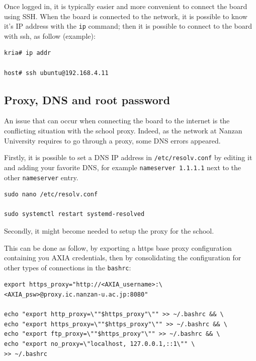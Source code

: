 \documentclass[10pt]{article}
\begin{document}
Once logged in, it is typically easier and more convenient to connect the board using SSH.
When the board is connected to the network, it is possible to know it's IP address with
the \verb|ip| command; then it is possible to connect to the board with ssh, as follow (example):
\begin{tcolorbox}
\begin{verbatim}
kria# ip addr

host# ssh ubuntu@192.168.4.11
\end{verbatim}
\end{tcolorbox}

\subsection{Proxy, DNS and root password}
\label{sec:proxy-dns}
An issue that can occur when connecting the board to the internet is the conflicting situation with
the school proxy.
Indeed, as the network at Nanzan University requires to go through a proxy, some DNS errors appeared.

Firstly, it is possible to set a DNS IP address in \verb|/etc/resolv.conf| by editing it and adding your favorite DNS, for example \verb|nameserver 1.1.1.1|
next to the other \verb|nameserver| entry.
\begin{tcolorbox}
\begin{verbatim}
sudo nano /etc/resolv.conf

sudo systemctl restart systemd-resolved
\end{verbatim}
\end{tcolorbox}

Secondly, it might become needed to setup the proxy for the school.

This can be done as follow, by exporting a https base proxy configuration containing you AXIA credentials, then
by consolidating the configuration for other types of connections in the \verb|bashrc|:
\begin{tcolorbox}
\begin{verbatim}
export https_proxy="http://<AXIA_username>:\
<AXIA_psw>@proxy.ic.nanzan-u.ac.jp:8080"

echo "export http_proxy=\""$https_proxy"\"" >> ~/.bashrc && \
echo "export https_proxy=\""$https_proxy"\"" >> ~/.bashrc && \
echo "export ftp_proxy=\""$https_proxy"\"" >> ~/.bashrc && \
echo "export no_proxy=\"localhost, 127.0.0.1,::1\"" \
>> ~/.bashrc
\end{verbatim}
\end{tcolorbox}
\end{document}

